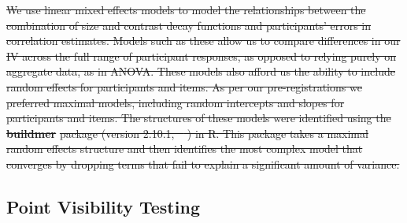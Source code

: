 \documentclass[manuscript, review, anonymous, screen]{acmart}
\providecommand{\DIFdeltex}[1]{{\protect\color{red}\sout{#1}}}                      %
\providecommand{\DIFdelbegin}{} %
\providecommand{\DIFdelend}{} %
\providecommand{\DIFdel}[1]{\texorpdfstring{\DIFdeltex{#1}}{}} %
\newcommand{\DIFscaledelfig}{0.5}
\newlength{\DIFdelgraphicswidth} %
\newlength{\DIFdelgraphicsheight} %
\newcommand{\DIFdelincludegraphics}[2][]{%
\sbox{\DIFdelgraphicsbox}{\DIFOincludegraphics[#1]{#2}}%
\settoboxwidth{\DIFdelgraphicswidth}{\DIFdelgraphicsbox} %
\settoboxtotalheight{\DIFdelgraphicsheight}{\DIFdelgraphicsbox} %
\scalebox{\DIFscaledelfig}{%
\parbox[b]{\DIFdelgraphicswidth}{\usebox{\DIFdelgraphicsbox}\\[-\baselineskip] \rule{\DIFdelgraphicswidth}{0em}}\llap{\resizebox{\DIFdelgraphicswidth}{\DIFdelgraphicsheight}{%
\setlength{\unitlength}{\DIFdelgraphicswidth}%
\begin{picture}(1,1)%
\thicklines\linethickness{2pt} %
{\color[rgb]{1,0,0}\put(0,0){\framebox(1,1){}}}%
{\color[rgb]{1,0,0}\put(0,0){\line( 1,1){1}}}%
{\color[rgb]{1,0,0}\put(0,1){\line(1,-1){1}}}%
\end{picture}%
}\hspace*{3pt}}} %
} %
\DeclareRobustCommand{\DIFdelbegin}{\DIFOdelbegin \let\includegraphics\DIFdelincludegraphics} %
\DeclareRobustCommand{\DIFdelend}{\DIFOaddend \let\includegraphics\DIFOincludegraphics} %
\begin{document}
\DIFdelbegin %

\DIFdel{We use linear mixed effects models to model the relationships between
the combination of size and contrast decay functions and participants'
errors in correlation estimates. Models such as these allow us to
compare differences in our IV across the full range of participant
responses, as opposed to relying purely on aggregate data, as in ANOVA.
These models also afford us the ability to include random effects for
participants and items. As per our pre-registrations we preferred
maximal models, including random intercepts and slopes for participants
and items. The structures of these models were identified using the
}\textbf{\DIFdel{buildmer}} %
\DIFdel{package (version 2.10.1, \mbox{%
\citep{voeten_buildmer}}\hskip0pt%
) in
R. This package takes a maximal random effects structure and then
identifies the most complex model that converges by dropping terms that
fail to explain a significant amount of variance.
}%

\DIFdelend \hypertarget{sec-VT}{%
\subsection{Point Visibility Testing}\label{sec-VT}}
\end{document}
